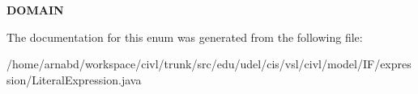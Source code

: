 \begin{DoxyCompactItemize}
\item 
\hypertarget{enumedu_1_1udel_1_1cis_1_1vsl_1_1civl_1_1model_1_1IF_1_1expression_1_1LiteralExpression_1_1LiteralKind_a5d5785616ae49dcf3358b0d4b5935e2f}{}{\bfseries D\+O\+M\+A\+I\+N}\label{enumedu_1_1udel_1_1cis_1_1vsl_1_1civl_1_1model_1_1IF_1_1expression_1_1LiteralExpression_1_1LiteralKind_a5d5785616ae49dcf3358b0d4b5935e2f}

\end{DoxyCompactItemize}


The documentation for this enum was generated from the following file\+:\begin{DoxyCompactItemize}
\item 
/home/arnabd/workspace/civl/trunk/src/edu/udel/cis/vsl/civl/model/\+I\+F/expression/Literal\+Expression.\+java\end{DoxyCompactItemize}
